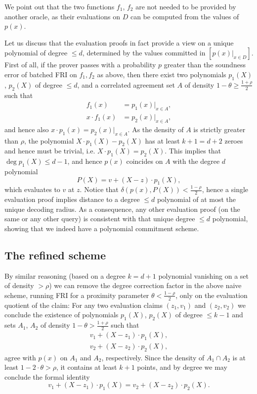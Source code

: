 \documentclass[11pt,article,oneside]{memoir}
\theoremstyle{definition}
\theoremstyle{remark}
\begin{document}
We point out that the two functions $f_1$, $f_2$ are not needed to be provided by another oracle, as their evaluations on $D$ can be computed from the values of $p(x)$.

Let us discuss that the evaluation proofs in fact provide a view on a unique polynomial of degree $\leq d$, determined by the values committed in $[p(x)|_{x\in D}]$.
First of all, if the prover passes with a probability $p$ greater than the soundness error of batched FRI on $f_1, f_2$ as above,  then there exist two polynomials $p_1(X)$, $p_2(X)$ of degree $\leq d$, and a correlated agreement set $A$ of density $1-\theta \geq \frac{1+\rho}{2}$ such that
\begin{align*}
f_1(x) &=p_1(x) \big|_{x\in A},
\\
x\cdot f_1(x) &= p_2(x)\big|_{x\in A},
\end{align*}
and hence also $x\cdot p_1(x) =p_2(x)\big|_{x\in A}$. 
As the density of $A$ is strictly greater than $\rho$, the polynomial $X\cdot p_1(X)-p_2(X)$ has at least $k+1=d+2$ zeroes and hence must be trivial, i.e. $X\cdot p_1(X) = p_2(X)$. 
This implies that $\deg p_1(X)\leq d-1$, and hence $p(x)$ coincides on $A$ with the degree $d$ polynomial 
\[
P(X)= v + (X-z)\cdot p_1(X),
\]
which evaluates to $v$ at $z$. 
Notice that $\delta(p(x),P(X)) < \frac{1-\rho}{2}$, hence a single evaluation proof implies distance to a degree $\leq d$ polynomial of at most the unique decoding radius. 
As a consequence, any other evaluation proof (on the same or any other query) is consistent with that unique degree $\leq d$ polynomial, showing that we indeed have a polynomial commitment scheme.

\subsection{The refined scheme}

By similar reasoning (based on a degree $k=d+1$ polynomial vanishing on a set of density $>\rho$)  we can  remove the degree correction factor in the above naive scheme, running FRI for a proximity parameter $\theta < \frac{1-\rho}{2}$, only on the evaluation quotient of the claim: 
For any two evaluation claims $(z_1,v_1)$ and $(z_2, v_2)$ we conclude the existence of polynomials $p_1(X)$, $p_2(X)$ of degree $\leq k-1$ and sets $A_1$, $A_2$ of density $1-\theta > \frac{1+\rho}{2}$ such that
\[
\begin{aligned}
v_1 + (X-z_1)\cdot p_1(X),
\\
v_2 + (X-z_2)\cdot p_2(X),
\end{aligned}
\]
agree with $p(x)$  on $A_1$ and $A_2$, respectively.
Since the density of $A_1\cap A_2$ is at least $1 - 2\cdot \theta > \rho$, it contains at least $k + 1$ points, and by degree we may conclude the formal identity
\[
v_1 + (X-z_1)\cdot p_1(X) = v_2 + (X-z_2)\cdot p_2(X).
\]
\end{document}
